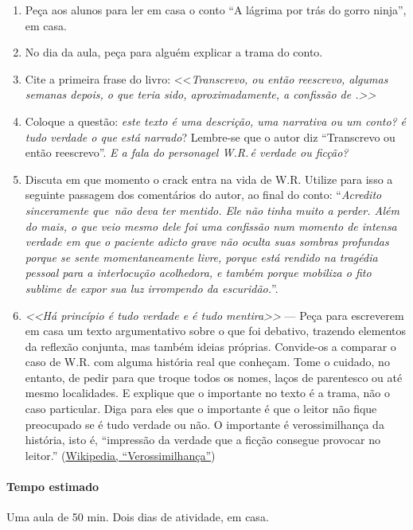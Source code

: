 \documentclass[11pt]{extarticle}
\begin{document}
   \begin{enumerate}
   	\item Peça aos alunos para ler em casa o conto ``A lágrima por trás do gorro ninja'', 
   	em casa. 
   	\item No dia da aula, peça para alguém explicar a trama do conto. 
   	\item Cite a primeira frase do livro: <<\emph{Transcrevo, ou então reescrevo, algumas semanas depois, o que teria sido, aproximadamente, a confissão de .>>}
   	\item Coloque a questão: 
   	\textit{este texto é uma descrição, uma narrativa ou um conto?}
   	\textit{é tudo verdade o que está narrado}? Lembre-se que o autor diz  
   	``Transcrevo ou então reescrevo''. \textit{E a fala do personagel W.R.\,é verdade ou ficção?}
   	\item Discuta em que momento o crack entra na vida de W.R. Utilize para isso a 
   	seguinte passagem dos comentários do autor, ao final do conto:
   	``\emph{Acredito sinceramente que \,não deva ter mentido. Ele não tinha
	muito a perder. Além do mais, o que veio mesmo dele foi uma confissão
	num momento de intensa verdade em que o paciente adicto grave não oculta
	suas sombras profundas porque se sente momentaneamente livre, porque
	está rendido na tragédia pessoal para a interlocução acolhedora, e
	também porque mobiliza o fito sublime de expor sua luz irrompendo da
	escuridão.}''.
	\item \textit{<<Há princípio é tudo verdade e é tudo mentira>>} ---
	Peça para escreverem em casa um texto argumentativo sobre o que foi 
	debativo, trazendo elementos da reflexão conjunta, mas também ideias próprias.
	Convide-os a comparar o caso de W.R. com alguma história real que conheçam. 
	Tome o cuidado, no entanto, de pedir para que troque todos os nomes, laços de
	parentesco ou até mesmo localidades. E explique que o importante no texto 
	é a trama, não o caso particular. Diga para eles que o importante é que 
	o leitor não fique preocupado se é tudo verdade ou não. O importante é 
	verossimilhança da história, isto é, ``impressão da verdade que a ficção 
	consegue provocar no leitor.'' (\href{https://pt.wikipedia.org/wiki/Verossimilhan%C3%A7a#:~:text=Verossimilhan%C3%A7a%20%C3%A9%20a%20impress%C3%A3o%20da,que%20acontecem%20na%20realidade%20vivida.}{Wikipedia, ``Verossimilhança''})
   \end{enumerate}
\paragraph{Tempo estimado} Uma aula de 50 min. Dois dias de atividade, em casa. 
\end{document}
